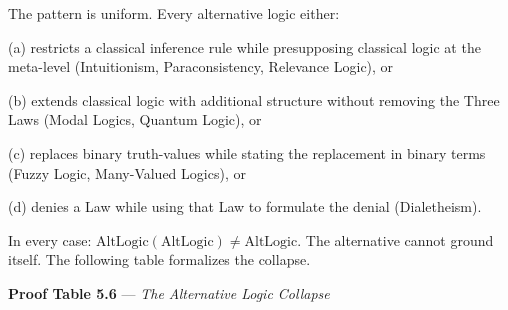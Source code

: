 \documentclass[10pt, openany, oneside]{book}
\begin{document}
The pattern is uniform. Every alternative logic either:

\vspace{0.3em}

\noindent (a) restricts a classical inference rule while presupposing classical logic at the meta-level (Intuitionism, Paraconsistency, Relevance Logic), or

\noindent (b) extends classical logic with additional structure without removing the Three Laws (Modal Logics, Quantum Logic), or

\noindent (c) replaces binary truth-values while stating the replacement in binary terms (Fuzzy Logic, Many-Valued Logics), or

\noindent (d) denies a Law while using that Law to formulate the denial (Dialetheism).

\vspace{0.3em}

\noindent In every case: $\text{AltLogic}(\text{AltLogic}) \neq \text{AltLogic}$. The alternative cannot ground itself. The following table formalizes the collapse.

\vspace{0.8em}

\textbf{Proof Table 5.6} --- \textit{The Alternative Logic Collapse}

\vspace{0.5em}
\end{document}
